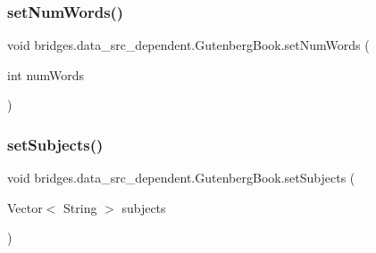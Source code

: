 \hypertarget{classbridges_1_1data__src__dependent_1_1_gutenberg_book_af84b3422dbb558aa08ff1b40c0068c87}{}\label{classbridges_1_1data__src__dependent_1_1_gutenberg_book_af84b3422dbb558aa08ff1b40c0068c87} 
\subsubsection{\texorpdfstring{set\+Num\+Words()}{setNumWords()}}
{\footnotesize\ttfamily void bridges.\+data\+\_\+src\+\_\+dependent.\+Gutenberg\+Book.\+set\+Num\+Words (\begin{DoxyParamCaption}\item[{int}]{num\+Words }\end{DoxyParamCaption})}

\hypertarget{classbridges_1_1data__src__dependent_1_1_gutenberg_book_a01c0c69770b1e58b8271f50a4bdf2966}{}\label{classbridges_1_1data__src__dependent_1_1_gutenberg_book_a01c0c69770b1e58b8271f50a4bdf2966} 
\subsubsection{\texorpdfstring{set\+Subjects()}{setSubjects()}}
{\footnotesize\ttfamily void bridges.\+data\+\_\+src\+\_\+dependent.\+Gutenberg\+Book.\+set\+Subjects (\begin{DoxyParamCaption}\item[{Vector$<$ String $>$}]{subjects }\end{DoxyParamCaption})}

\hypertarget{classbridges_1_1data__src__dependent_1_1_gutenberg_book_a1f4b11121296e76e4d5afc86157b52d4}{}\label{classbridges_1_1data__src__dependent_1_1_gutenberg_book_a1f4b11121296e76e4d5afc86157b52d4} 
